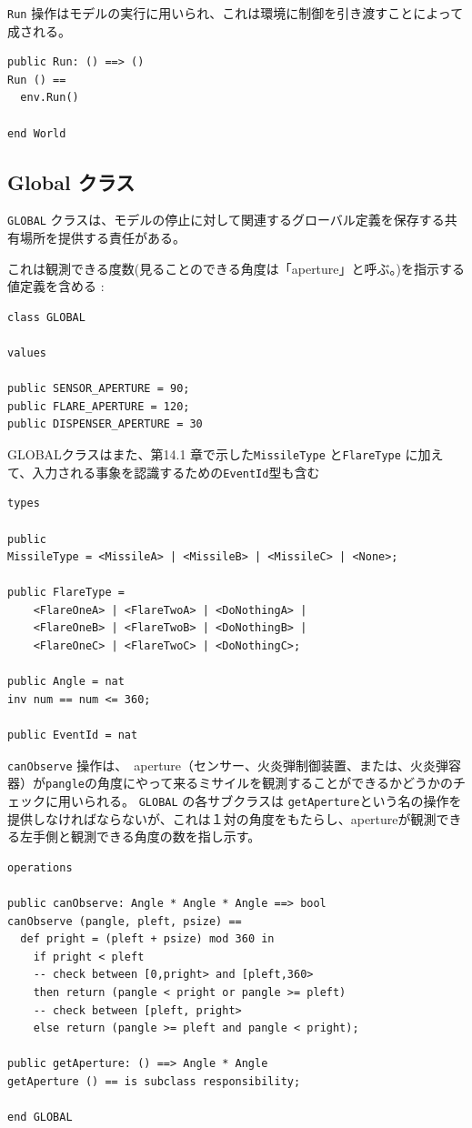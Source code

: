\documentclass[\pformat,12pt]{jreport}
\begin{document}
\texttt{Run} 操作はモデルの実行に用いられ、これは環境に制御を引き渡すことによって成される。

\begin{lstlisting}
public Run: () ==> ()
Run () == 
  env.Run()

end World
\end{lstlisting}

\subsection{Global クラス}\label{sec:GlobalSeq}

 \texttt{GLOBAL} クラスは、モデルの停止に対して関連するグローバル定義を保存する共有場所を提供する責任がある。

これは観測できる度数(見ることのできる角度は「aperture」と呼ぶ。)を指示する値定義を含める :

\begin{lstlisting}
class GLOBAL

values

public SENSOR_APERTURE = 90;
public FLARE_APERTURE = 120;
public DISPENSER_APERTURE = 30
\end{lstlisting}

GLOBALクラスはまた、第14.1 章で示した\texttt{MissileType} と\texttt{FlareType}  に加えて、入力される事象を認識するための\texttt{EventId}型も含む
\newpage

\begin{lstlisting}
types

public 
MissileType = <MissileA> | <MissileB> | <MissileC> | <None>;

public FlareType =
    <FlareOneA> | <FlareTwoA> | <DoNothingA> | 
    <FlareOneB> | <FlareTwoB> | <DoNothingB> | 
    <FlareOneC> | <FlareTwoC> | <DoNothingC>;

public Angle = nat
inv num == num <= 360;

public EventId = nat
\end{lstlisting}

 \texttt{canObserve} 操作は、　aperture（センサー、火炎弾制御装置、または、火炎弾容器）が\texttt{pangle}の角度にやって来るミサイルを観測することができるかどうかのチェックに用いられる。
 \texttt{GLOBAL} の各サブクラスは \texttt{getAperture}という名の操作を提供しなければならないが、これは１対の角度をもたらし、apertureが観測できる左手側と観測できる角度の数を指し示す。
 
\begin{lstlisting}
operations

public canObserve: Angle * Angle * Angle ==> bool
canObserve (pangle, pleft, psize) ==
  def pright = (pleft + psize) mod 360 in
    if pright < pleft
    -- check between [0,pright> and [pleft,360>
    then return (pangle < pright or pangle >= pleft)
    -- check between [pleft, pright>
    else return (pangle >= pleft and pangle < pright);
       
public getAperture: () ==> Angle * Angle
getAperture () == is subclass responsibility;

end GLOBAL
\end{lstlisting}
\end{document}
